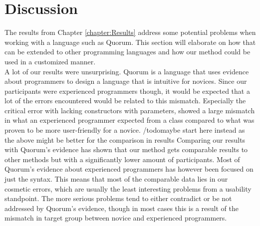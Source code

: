 \chapter{Discussion}
The results from Chapter \ref{chapter:Results} address some potential problems when working with a language such as Quorum. This section will elaborate on how that can be extended to other programming languages and how our method could be used in a customized manner.
\\
A lot of our results were unsurprising.
Quorum is a language that uses evidence about programmers to design a language that is intuitive for novices.
Since our participants were experienced programmers though, it would be expected that a lot of the errors encountered would be related to this mismatch.
Especially the critical error with lacking constructors with parameters, showed a large mismatch in what an experienced programmer expected from a class compared to what was proven to be more user-friendly for a novice.
/todo{maybe start here instead as the above might be better for the comparison in results}
Comparing our results with Quorum's evidence has shown that our method gets comparable results to other methods but with a significantly lower amount of participants.
Most of Quorum's evidence about experienced programmers has however been focused on just the syntax.
This means that most of the comparable data lies in our cosmetic errors, which are usually the least interesting problems from a usability standpoint.
The more serious problems tend to either contradict or be not addressed by Quorum's evidence, though in most cases this is a result of the mismatch in target group between novice and experienced programmers.



